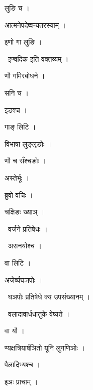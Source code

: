 \documentclass[10pt, openany, oneside]{book}
\begin{document}
\noindent लुङि च ।

\noindent आत्मनेपदेष्वन्यतरस्याम् ।

\noindent इणो गा लुङि ।

\par\noindent\hspace{1.5em}{\vps वा॰}~{\qt इण्वदिक इति वक्तव्यम् ।}

\noindent णौ गमिरबोधने ।

\noindent सनि च ।

\noindent इङश्च ।

\noindent गाङ् लिटि ।

\noindent विभाषा लुङ्लृङोः ।

\noindent णौ च सँश्चङोः ।

\noindent अस्तेर्भूः ।

\noindent ब्रुवो वचिः ।

\noindent चक्षिङः ख्याञ् ।

\par\noindent\hspace{1.5em}{\vps वा॰}~{\qt वर्जने प्रतिषेधः ।}

\par\noindent\hspace{1.5em}{\vps वा॰}~{\qt असनयोश्च ।}

\noindent वा लिटि ।

\noindent अजेर्व्यघञपोः ।

\par\noindent\hspace{1.5em}{\vps वा॰}~{\qt घञपोः प्रतिषेधे क्य उपसंख्यानम् ।}

\par\noindent\hspace{1.5em}{\vps वा॰}~{\qt वलादावार्धधातुके वेष्यते ।}

\noindent वा यौ ।

\noindent ण्यक्षत्रियार्षञितो यूनि लुगणिञोः ।

\noindent पैलादिभ्यश्च ।

\noindent इञः प्राचाम् ।
\end{document}
